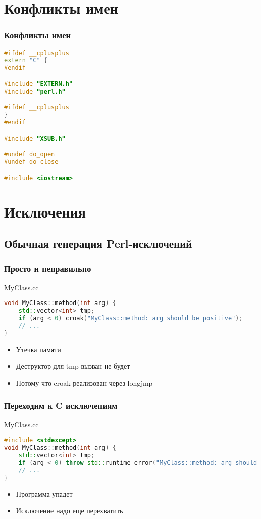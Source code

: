 \documentclass[pdflatex,hyperref={unicode=true}]{beamer}
\DeclareRobustCommand{\cpp}{
    \texorpdfstring{\hbox{C\hspace{-0.5ex}\protect\raisebox{0.5ex}{\protect\scalebox{0.67}{++}}}}{C++}
}
\begin{document}
\section{Конфликты имен}

\begin{frame}[fragile]
    \frametitle{Конфликты имен}
    \begin{lstlisting}[language=C++,style=PerlXS]
#ifdef __cplusplus
extern "C" {
#endif

#include "EXTERN.h"
#include "perl.h"

#ifdef __cplusplus
}
#endif

#include "XSUB.h"

#undef do_open
#undef do_close

#include <iostream>
    \end{lstlisting}
\end{frame}

\section{Исключения}

\subsection{Обычная генерация Perl-исключений}
\begin{frame}[fragile]
    \frametitle{Просто и неправильно}
    MyClass.cc
    \begin{lstlisting}[language=C++,style=PerlXS]
void MyClass::method(int arg) {
    std::vector<int> tmp;
    if (arg < 0) croak("MyClass::method: arg should be positive");
    // ...
}
    \end{lstlisting}
    \begin{itemize}
        \item<2-| alert@2-> Утечка памяти
        \item<3-> Деструктор для tmp вызван не будет
        \item<4-> Потому что croak реализован через longjmp
    \end{itemize}
\end{frame}

\begin{frame}[fragile]
    \frametitle{Переходим к \cpp исключениям}
    MyClass.cc
    \begin{lstlisting}[language=C++,style=PerlXS]
#include <stdexcept>
void MyClass::method(int arg) {
    std::vector<int> tmp;
    if (arg < 0) throw std::runtime_error("MyClass::method: arg should be positive");
    // ...
}
    \end{lstlisting}
    \begin{itemize}
        \item Программа упадет
        \item Исключение надо еще перехватить
    \end{itemize}
\end{frame}
\end{document}
